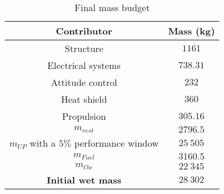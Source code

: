 \begin{table}[H]
	\centering
\begin{tabular}[H]{|c|c|}
	\hline
	\cellcolor{gray!50}Contributor & \cellcolor{gray!50}Mass (kg)\\
	\hline
	Structure & $1161$\\
	\hline
	Electrical systems & $738.31$\\
	\hline
	Attitude control & $232$\\
	\hline
	Heat shield & $360$\\
	\hline
	Propulsion & $305.16$\\
	\hline
	\cellcolor{green!30}\textbf{$m_{rest}$} & \textbf{$2796.5$}\\
	\hline
	\cellcolor{green!30}\textbf{$m_{UP}$} with a $5\%$ performance window & \textbf{$25\ 505$}\\
	\hline
	\cellcolor{green!30}\textbf{$m_{Fuel}$}  & \textbf{$3160. 5$}\\
	\hline
	\cellcolor{green!30}\textbf{$m_{Ox}$}  & \textbf{$22\ 345$}\\
	\hline
	\cellcolor{red!30}\textbf{Initial wet mass}  & \textbf{$28\ 302$}\\
	\hline
\end{tabular}
\caption{Final mass budget}
\end{table}
